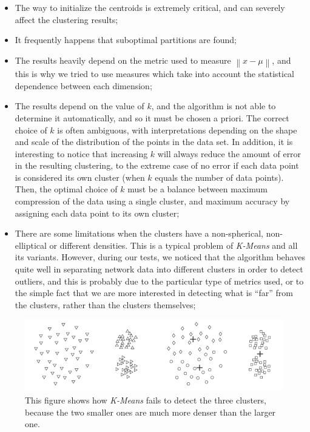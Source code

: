 \documentclass[12pt,a4paper,cucitura]{toptesi}
\begin{document}
\begin{itemize}
\item The way to initialize the centroids is extremely critical, and can severely affect the clustering results;
\item It frequently happens that suboptimal partitions are found;
\item The results heavily depend on the metric used to measure $ \left \| x - \mu  \right\| $, and this is why we tried to use measures which take into account the statistical dependence between each dimension;
\item The results depend on the value of $k$, and the algorithm is not able to determine it automatically, and so it must be chosen a priori. The correct choice of $k$ is often ambiguous, with interpretations depending on the shape and scale of the distribution of the points in the data set. In addition, it is interesting to notice that increasing $k$ will always reduce the amount of error in the resulting clustering, to the extreme case of no error if each data point is considered its own cluster (when $k$ equals the number of data points). Then, the optimal choice of $k$ must be a balance between maximum compression of the data using a single cluster, and maximum accuracy by assigning each data point to its own cluster;
\item There are some limitations when the clusters have a non-spherical, non-elliptical or different densities. This is a typical problem of \emph{K-Means} and all its variants. 
However, during our tests, we noticed that the algorithm behaves quite well in separating network data into different clusters in order to detect outliers, and this is probably due to the particular type of metrics used, or to the simple fact that we are more interested in detecting what is ``far'' from the clusters, rather than the clusters themselves;
\end{itemize}

\begin{figure}
\centering
\includegraphics[width=\textwidth]{kmeans2.png}
\caption[\emph{K-Means} iterations]{This figure shows how \emph{K-Means} fails to detect the three clusters, because the two smaller ones are much more denser than the larger one.}
\end{figure}
\end{document}
